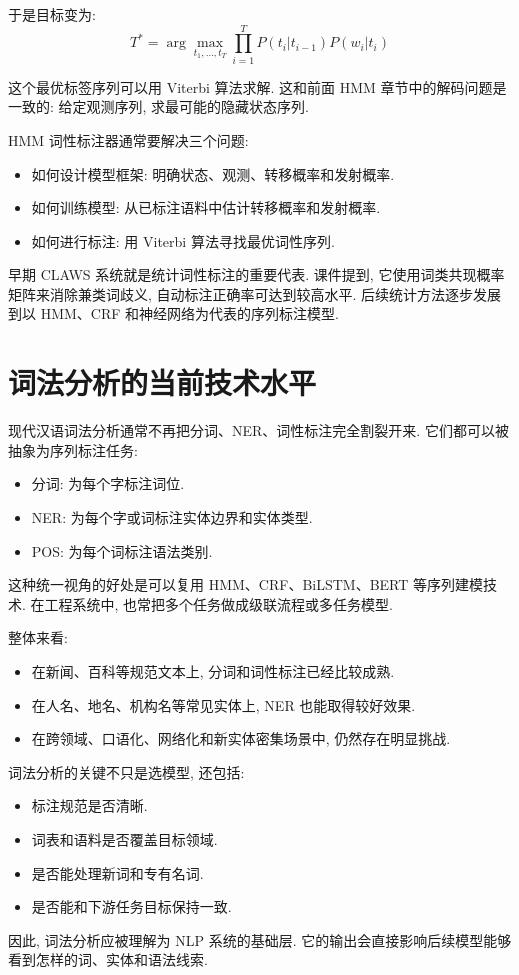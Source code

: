 于是目标变为:
\[
T^*
  = \arg\max_{t_1, \dots, t_T}
    \prod_{i=1}^T P(t_i | t_{i-1}) P(w_i | t_i)
\]

这个最优标签序列可以用 Viterbi 算法求解.
这和前面 HMM 章节中的解码问题是一致的: 给定观测序列, 求最可能的隐藏状态序列.

HMM 词性标注器通常要解决三个问题:

\begin{itemize}
\item 如何设计模型框架: 明确状态、观测、转移概率和发射概率.
\item 如何训练模型: 从已标注语料中估计转移概率和发射概率.
\item 如何进行标注: 用 Viterbi 算法寻找最优词性序列.
\end{itemize}

早期 CLAWS 系统就是统计词性标注的重要代表.
课件提到, 它使用词类共现概率矩阵来消除兼类词歧义, 自动标注正确率可达到较高水平.
后续统计方法逐步发展到以 HMM、CRF 和神经网络为代表的序列标注模型.

\section{词法分析的当前技术水平}


现代汉语词法分析通常不再把分词、NER、词性标注完全割裂开来.
它们都可以被抽象为序列标注任务:

\begin{itemize}
\item 分词: 为每个字标注词位.
\item NER: 为每个字或词标注实体边界和实体类型.
\item POS: 为每个词标注语法类别.
\end{itemize}

这种统一视角的好处是可以复用 HMM、CRF、BiLSTM、BERT 等序列建模技术.
在工程系统中, 也常把多个任务做成级联流程或多任务模型.

整体来看:

\begin{itemize}
\item 在新闻、百科等规范文本上, 分词和词性标注已经比较成熟.
\item 在人名、地名、机构名等常见实体上, NER 也能取得较好效果.
\item 在跨领域、口语化、网络化和新实体密集场景中, 仍然存在明显挑战.
\end{itemize}

词法分析的关键不只是选模型, 还包括:

\begin{itemize}
\item 标注规范是否清晰.
\item 词表和语料是否覆盖目标领域.
\item 是否能处理新词和专有名词.
\item 是否能和下游任务目标保持一致.
\end{itemize}

因此, 词法分析应被理解为 NLP 系统的基础层.
它的输出会直接影响后续模型能够看到怎样的词、实体和语法线索.
